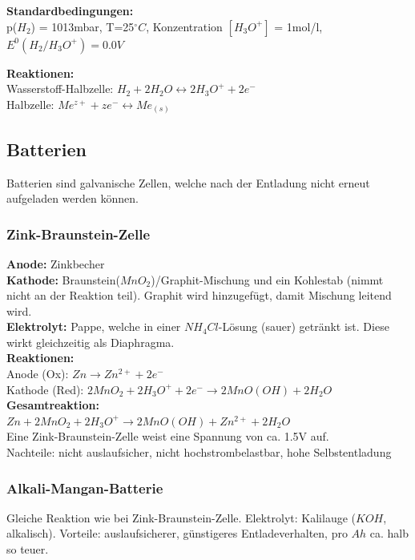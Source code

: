\textbf{Standardbedingungen:}\\
p($H_2$) = 1013mbar, T=25$^\circ C$, Konzentration $[H_3O^+]$ = 1mol/l, $E^0(H_2/H_3O^+) = 0.0V$

\textbf{Reaktionen:} \\
Wasserstoff-Halbzelle: $H_2 + 2H_2O \leftrightarrow 2 H_3O^+ + 2 e^-$ \\
Halbzelle: $Me^{z+} + z e^- \leftrightarrow Me_{(s)}$

\subsection{Batterien}
Batterien sind galvanische Zellen, welche nach der Entladung nicht erneut aufgeladen werden können.

\subsubsection{Zink-Braunstein-Zelle}
\textbf{Anode:} Zinkbecher\\
\textbf{Kathode:} Braunstein($MnO_2$)/Graphit-Mischung und ein Kohlestab (nimmt nicht an der Reaktion teil). Graphit wird hinzugefügt, damit Mischung leitend wird.\\ 
\textbf{Elektrolyt:} Pappe, welche in einer $NH_4Cl$-Lösung (sauer) getränkt ist. Diese wirkt gleichzeitig als Diaphragma.\\
\textbf{Reaktionen:} \\
Anode (Ox): $Zn \rightarrow Zn^{2+}+2e^-$\\
Kathode (Red): $2MnO_2+2H_3O^++2e^- \rightarrow 2MnO(OH)+2H_2O$\\
\textbf{Gesamtreaktion:} \\
$Zn+2MnO_2+2H_3O^+ \rightarrow 2MnO(OH)+Zn^{2+}+2H_2O$\\
Eine Zink-Braunstein-Zelle weist eine Spannung von ca. 1.5V auf.\\
Nachteile: nicht auslaufsicher, nicht hochstrombelastbar, hohe Selbstentladung

\subsubsection{Alkali-Mangan-Batterie}
Gleiche Reaktion wie bei Zink-Braunstein-Zelle. Elektrolyt: Kalilauge ($KOH
$, alkalisch). Vorteile: auslaufsicherer, günstigeres Entladeverhalten, pro $Ah$ ca. halb so teuer.

